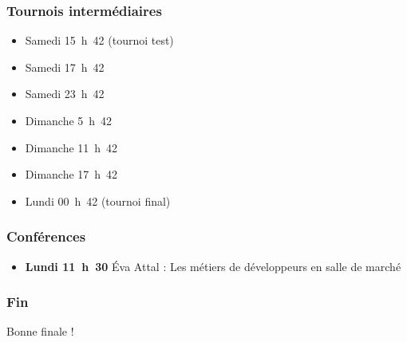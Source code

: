 \documentclass{beamer}
\begin{document}
\begin{frame}
    \frametitle{Tournois intermédiaires}
    \begin{itemize}
        \item Samedi 15~h~42 (tournoi test)
        \item Samedi 17~h~42
        \item Samedi 23~h~42
        \item Dimanche 5~h~42
        \item Dimanche 11~h~42
        \item Dimanche 17~h~42
        \item Lundi 00~h~42 (tournoi final)
    \end{itemize}
\end{frame}

\begin{frame}
    \frametitle{Conférences}
    \begin{itemize}
        \item \textbf{Lundi 11~h~30} Éva Attal : Les métiers de développeurs en salle de marché
    \end{itemize}
\end{frame}

\begin{frame}
    \frametitle{Fin}
    Bonne finale !
\end{frame}
\end{document}
